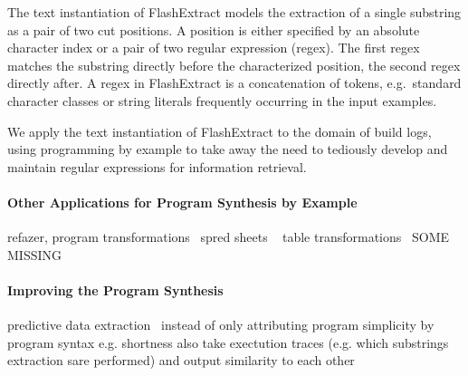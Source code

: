 \documentclass[\myrootdir/main.tex]{subfiles}
\begin{document}
The text instantiation of FlashExtract models the extraction of a single substring as a pair of two cut positions.
A position is either specified by an absolute character index or a pair of two regular expression (regex).
The first regex matches the substring directly before the characterized position, the second regex directly after.
A regex in FlashExtract is a concatenation of tokens, e.g.\ standard character classes or string literals frequently occurring in the input examples.

We apply the text instantiation of FlashExtract to the domain of build logs, using programming by example to take away the need to tediously develop and maintain regular expressions for information retrieval.


\paragraph{Other Applications for Program Synthesis by Example}
refazer, program transformations~\cite{rolim2017learning}
spred sheets ~\cite{gulwani2011automating}
table transformations~\cite{harris2011spreadsheet}
SOME MISSING

\paragraph{Improving the Program Synthesis}
predictive data extraction~\cite{raza2017automated}
instead of only attributing program simplicity by program syntax e.g. shortness also take exectution traces (e.g. which substrings extraction sare performed) and output similarity to each other~\cite{ellis2017learning}
\end{document}
